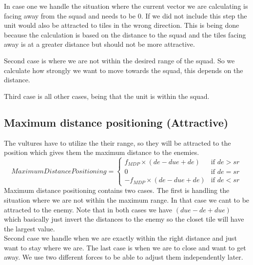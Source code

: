 		In case one we handle the situation where the current vector we are calculating is facing away from the squad and needs to be 0. If we did not include this step the unit would also be attracted to tiles in the wrong direction. This is being done because the calculation is based on the distance to the squad and the tiles facing away is at a greater distance but should not be more attractive.
		
		Second case  is where we are not within the desired range of the squad. So we calculate how strongly we want to move towards the squad, this depends on the distance. 
		
		Third case is all other cases, being that the unit is within the squad.
					
	\subsection*{Maximum distance positioning (Attractive)}
		The vultures have to utilize the their range, so they will be attracted to the position which gives them the maximum distance 
		to the enemies.
		\begin{displaymath}
			MaximumDistancePositioning = \begin{cases}
					f_{MDP} \times (de - due + de) & \text{if } de > sr\\
					0 & \text{if } de = sr\\
					-f_{MDP} \times (de - due + de) & \text{if } de < sr
				\end{cases}		
		\end{displaymath}
		Maximum distance positioning contains two cases. The first is handling the situation where we are not within the maximum range. In that case we cant to be attracted to the enemy. Note that in both cases we have $(due - de + due)$ which basically just invert the distances to the enemy so the closet tile will have the largest value.\\
		Second case we handle when we are exactly within the right distance and just want to stay where we are.
		The last case is when we are to close and want to get away.
		We use two different forces to be able to adjust them independently later.
		
		
		

